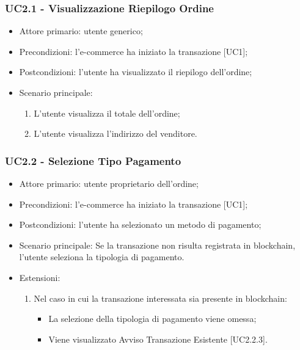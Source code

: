 \subsubsection{UC2.1 - Visualizzazione Riepilogo Ordine}\label{sssec: UC2.1}

\begin{itemize}
    \item Attore primario: utente generico;
    \item Precondizioni: l'e-commerce\glo{} ha iniziato la transazione [UC1];
    \item Postcondizioni: l'utente ha visualizzato il riepilogo dell'ordine;
    \item Scenario principale:
          \begin{enumerate}
              \item L'utente visualizza il totale dell'ordine;
              \item L'utente visualizza l'indirizzo del venditore.
          \end{enumerate}
\end{itemize}

\subsubsection{UC2.2 - Selezione Tipo Pagamento}\label{sssec: UC2.2}

\begin{itemize}
    \item Attore primario: utente proprietario dell'ordine;
    \item Precondizioni: l'e-commerce\glo{} ha iniziato la transazione [UC1];
    \item Postcondizioni: l'utente ha selezionato un metodo di pagamento;
    \item Scenario principale: Se la transazione non risulta registrata in blockchain, l'utente seleziona la tipologia di pagamento.
    \item Estensioni:
          \begin{enumerate}
            \item Nel caso in cui la transazione interessata sia presente in blockchain:
                \begin{itemize}
                    \item La selezione della tipologia di pagamento viene omessa;
                    \item Viene visualizzato Avviso Transazione Esistente [UC2.2.3].
                \end{itemize}
          \end{enumerate}
\end{itemize}

